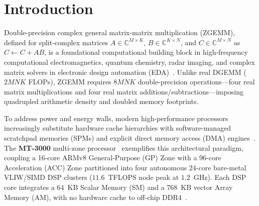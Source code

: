 \documentclass[conference]{IEEEtran}
\begin{document}
\section{Introduction}
\label{sec:intro}
Double-precision complex general matrix-matrix multiplication (ZGEMM), defined for split-complex matrices $A \in \mathbb{C}^{M \times K}$, $B \in \mathbb{C}^{K \times N}$, and $C \in \mathbb{C}^{M \times N}$ as $C \leftarrow C + AB$, is a foundational computational building block in high-frequency computational electromagnetics, quantum chemistry, radar imaging, and complex matrix solvers in electronic design automation (EDA)~\cite{barrett2010complexhpl, vanzee2017complex}. Unlike real DGEMM ($2MNK$ FLOPs), ZGEMM requires $8MNK$ double-precision operations---four real matrix multiplications and four real matrix additions/subtractions---imposing quadrupled arithmetic density and doubled memory footprints.

To address power and energy walls, modern high-performance processors increasingly substitute hardware cache hierarchies with software-managed scratchpad memories (SPMs) and explicit direct memory access (DMA) engines~\cite{kahle2005cell, igual2012dsp, fu2016sunway, jiang2017sw26010}. The \textbf{MT-3000} multi-zone processor~\cite{lu2022mt3000} exemplifies this architectural paradigm, coupling a 16-core ARMv8 General-Purpose (GP) Zone with a 96-core Acceleration (ACC) Zone partitioned into four autonomous 24-core bare-metal VLIW/SIMD DSP clusters ($11.6$~TFLOPS node peak at $1.2$~GHz). Each DSP core integrates a $64$~KB Scalar Memory (SM) and a $768$~KB vector Array Memory (AM), with no hardware cache to off-chip DDR4~\cite{fang2026mtgemm, qi2025constraint}.
\end{document}
